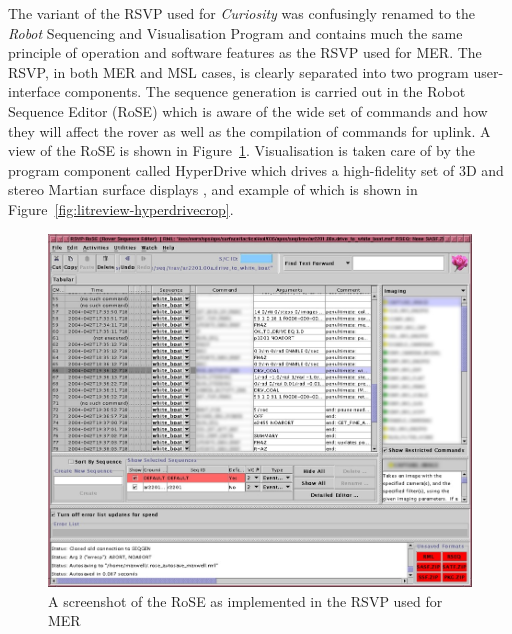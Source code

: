       The variant of the RSVP used for \textit{Curiosity} was confusingly renamed to the \textit{Robot} Sequencing and Visualisation Program and contains much the same principle of operation and software features as the RSVP used for MER. The RSVP, in both MER and MSL cases, is clearly separated into two program user-interface components. The sequence generation is carried out in the Robot Sequence Editor (RoSE) \cite{soseroverdrivingtools} which is aware of the wide set of commands and how they will affect the rover as well as the compilation of commands for uplink. A view of the RoSE is shown in Figure~\ref{fig:litreview-rose}. Visualisation is taken care of by the program component called HyperDrive which drives a high-fidelity set of 3D and stereo Martian surface displays \cite{nasatechbrief2013rsvp}, and example of which is shown in Figure~\ref{fig:litreview-hyperdrivecrop}.
      
      \begin{figure}[H]
        \centering
        \includegraphics[width=0.7\linewidth]{figures/litreview-RoSE}
        \caption[A screenshot of the RoSE as implemented in the RSVP used for MER]{A screenshot of the RoSE as implemented in the RSVP used for MER \cite{fig:litreview-rose_cite}}
        \label{fig:litreview-rose}
      \end{figure}
      
